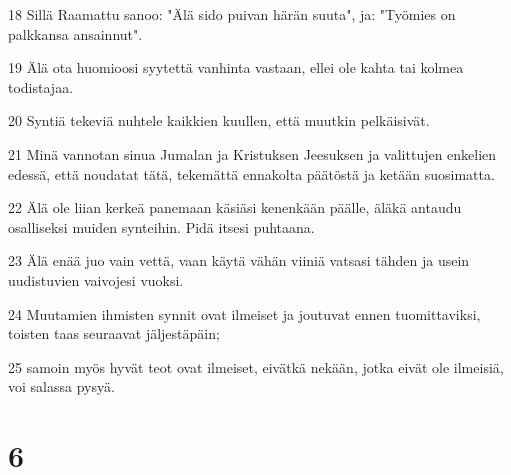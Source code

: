 \par 18 Sillä Raamattu sanoo: "Älä sido puivan härän suuta", ja: "Työmies on palkkansa ansainnut".
\par 19 Älä ota huomioosi syytettä vanhinta vastaan, ellei ole kahta tai kolmea todistajaa.
\par 20 Syntiä tekeviä nuhtele kaikkien kuullen, että muutkin pelkäisivät.
\par 21 Minä vannotan sinua Jumalan ja Kristuksen Jeesuksen ja valittujen enkelien edessä, että noudatat tätä, tekemättä ennakolta päätöstä ja ketään suosimatta.
\par 22 Älä ole liian kerkeä panemaan käsiäsi kenenkään päälle, äläkä antaudu osalliseksi muiden synteihin. Pidä itsesi puhtaana.
\par 23 Älä enää juo vain vettä, vaan käytä vähän viiniä vatsasi tähden ja usein uudistuvien vaivojesi vuoksi.
\par 24 Muutamien ihmisten synnit ovat ilmeiset ja joutuvat ennen tuomittaviksi, toisten taas seuraavat jäljestäpäin;
\par 25 samoin myös hyvät teot ovat ilmeiset, eivätkä nekään, jotka eivät ole ilmeisiä, voi salassa pysyä.

\chapter{6}

